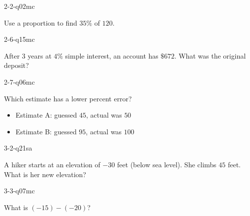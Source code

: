 \documentclass[12pt, fleqn, openany]{studyGuide}
\begin{document}
\begin{practiceQuestion}{2-2-q02}{mc}
\begin{questionText}
Use a proportion to find $35\%$ of $120$.
\end{questionText}
\end{practiceQuestion}

\begin{practiceQuestion}{2-6-q15}{mc}
\begin{questionText}
After $3$ years at $4\%$ simple interest, an account has $\$672$. What was the original deposit?
\end{questionText}
\end{practiceQuestion}

\begin{practiceQuestion}{2-7-q06}{mc}
\begin{questionText}
Which estimate has a lower percent error?
\begin{itemize}
    \item Estimate A: guessed $45$, actual was $50$
    \item Estimate B: guessed $95$, actual was $100$
\end{itemize}
\end{questionText}
\end{practiceQuestion}

\begin{practiceQuestion}{3-2-q21}{sa}
\begin{questionText}
A hiker starts at an elevation of $-30$ feet (below sea level). She climbs $45$ feet. What is her new elevation?
\end{questionText}
\end{practiceQuestion}

\begin{practiceQuestion}{3-3-q07}{mc}
\begin{questionText}
What is $(-15) - (-20)$?
\end{questionText}
\end{practiceQuestion}
\end{document}
